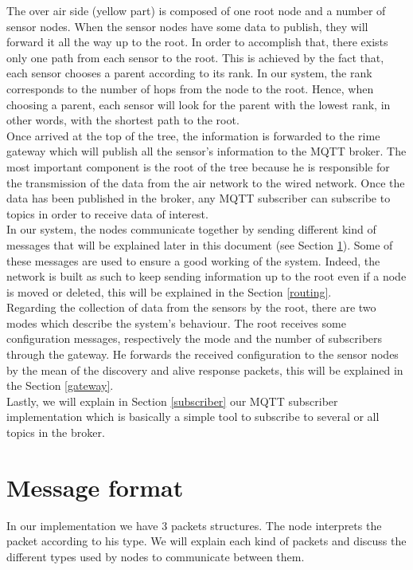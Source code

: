 \documentclass[a4paper,10pt]{article}
\begin{document}
The over air side (yellow part) is composed of one root node and a number of sensor nodes. When the sensor nodes have some data to publish, they will forward it all the way up to the root. In order to accomplish that, there exists only one path from each sensor to the root. This is achieved by the fact that, each sensor chooses a parent according to its rank. In our system, the rank corresponds to the number of hops from the node to the root. Hence, when choosing a parent, each sensor will look for the parent with the lowest rank, in other words, with the shortest path to the root. \\

Once arrived at the top of the tree, the information is forwarded to the rime gateway which will publish all the sensor's information to the MQTT broker. The most important component is the root of the tree because he is responsible for the transmission of the data from the air network to the wired network. Once the data has been published in the broker, any MQTT subscriber can subscribe to topics in order to receive data of interest. \\

In our system, the nodes communicate together by sending different kind of messages that will be explained later in this document (see Section \ref{msgFormat}). Some of these messages are used to ensure a good working of the system. Indeed, the network is built as such to keep sending information up to the root even if a node is moved or deleted, this will be explained in the Section \ref{routing}. \\


Regarding the collection of data from the sensors by the root, there are two modes which describe the system's behaviour. The root receives some configuration messages, respectively the mode and the number of subscribers through the gateway.  He forwards the received configuration to the sensor nodes by the mean of the discovery and alive response packets, this will be explained in the Section \ref{gateway}. \\

Lastly, we will explain in Section \ref{subscriber} our MQTT subscriber implementation which is basically a simple tool to subscribe to several or all topics in the broker.



\section{Message format}
\label{msgFormat}
In our implementation we have 3 packets structures. The node interprets the packet according to his type. We will explain each kind of packets and discuss the different types used by nodes to communicate between them.
\end{document}
